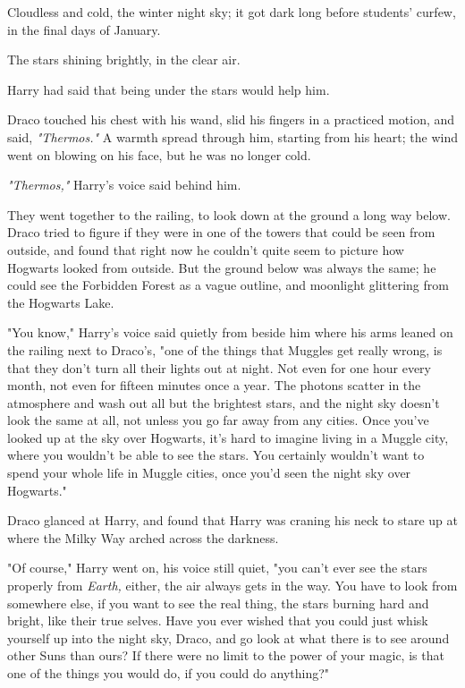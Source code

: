 Cloudless and cold, the winter night sky; it got dark long before students'
curfew, in the final days of January.

The stars shining brightly, in the clear air.

Harry had said that being under the stars would help him.

Draco touched his chest with his wand, slid his fingers in a practiced motion,
and said, \emph{"Thermos."} A warmth spread through him, starting from his
heart; the wind went on blowing on his face, but he was no longer cold.

\emph{"Thermos,"} Harry's voice said behind him.

They went together to the railing, to look down at the ground a long way below.
Draco tried to figure if they were in one of the towers that could be seen from
outside, and found that right now he couldn't quite seem to picture how
Hogwarts looked from outside. But the ground below was always the same; he
could see the Forbidden Forest as a vague outline, and moonlight glittering
from the Hogwarts Lake.

"You know," Harry's voice said quietly from beside him where his arms leaned on
the railing next to Draco's, "one of the things that Muggles get really wrong,
is that they don't turn all their lights out at night. Not even for one hour
every month, not even for fifteen minutes once a year. The photons scatter in
the atmosphere and wash out all but the brightest stars, and the night sky
doesn't look the same at all, not unless you go far away from any cities. Once
you've looked up at the sky over Hogwarts, it's hard to imagine living in a
Muggle city, where you wouldn't be able to see the stars. You certainly
wouldn't want to spend your whole life in Muggle cities, once you'd seen the
night sky over Hogwarts."

Draco glanced at Harry, and found that Harry was craning his neck to stare up
at where the Milky Way arched across the darkness.

"Of course," Harry went on, his voice still quiet, "you can't ever see the
stars properly from \emph{Earth,} either, the air always gets in the way. You
have to look from somewhere else, if you want to see the real thing, the stars
burning hard and bright, like their true selves. Have you ever wished that you
could just whisk yourself up into the night sky, Draco, and go look at what
there is to see around other Suns than ours? If there were no limit to the
power of your magic, is that one of the things you would do, if you could do
anything?"

